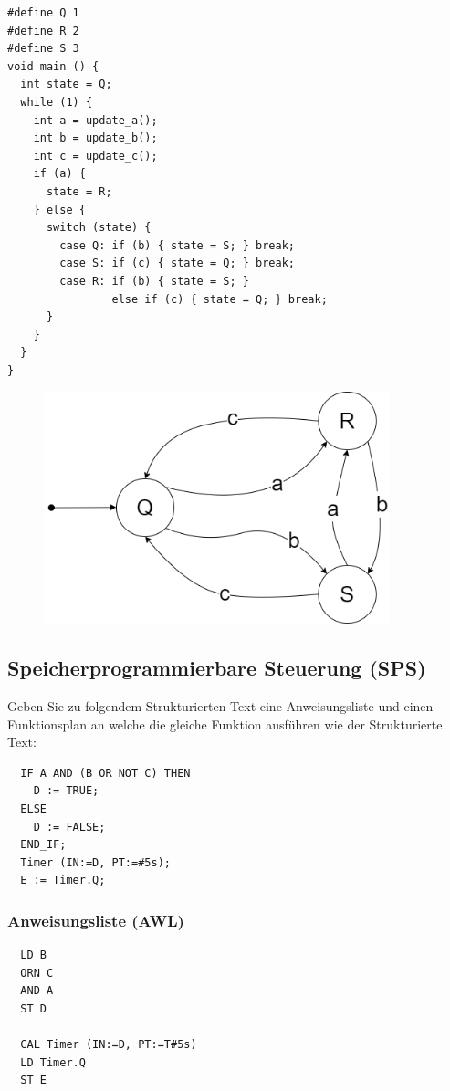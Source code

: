 \begin{lstlisting}
#define Q 1
#define R 2
#define S 3
void main () {
  int state = Q;
  while (1) {
    int a = update_a();
    int b = update_b();
    int c = update_c();
    if (a) {
      state = R;
    } else {
      switch (state) {
        case Q: if (b) { state = S; } break;
        case S: if (c) { state = Q; } break;
        case R: if (b) { state = S; }
                else if (c) { state = Q; } break;
      }
    }
  }
}

\end{lstlisting}
\begin{figure}[H]
  \includegraphics[width=10cm]{images/KA160322/5a.png}
  \centering
\end{figure}

\subsection{Speicherprogrammierbare Steuerung (SPS)}
Geben Sie zu folgendem Strukturierten Text eine Anweisungsliste und einen Funktionsplan an welche die
gleiche Funktion ausführen wie der Strukturierte Text:

\begin{lstlisting}
  IF A AND (B OR NOT C) THEN
    D := TRUE;
  ELSE
    D := FALSE;
  END_IF;
  Timer (IN:=D, PT:=#5s);
  E := Timer.Q;
\end{lstlisting}

\subsubsection{Anweisungsliste (AWL)}
\begin{lstlisting}
  LD B
  ORN C
  AND A
  ST D

  CAL Timer (IN:=D, PT:=T#5s)
  LD Timer.Q
  ST E
\end{lstlisting}

